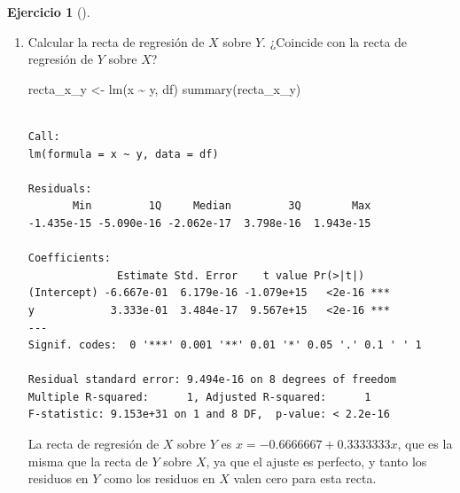 \documentclass[
  a4paper,
]{scrreport}
\newenvironment{Shaded}{\begin{snugshade}}{\end{snugshade}}
\newcommand{\FunctionTok}[1]{\textcolor[rgb]{0.28,0.35,0.67}{#1}}
\newcommand{\NormalTok}[1]{\textcolor[rgb]{0.00,0.23,0.31}{#1}}
\newcommand{\OtherTok}[1]{\textcolor[rgb]{0.00,0.23,0.31}{#1}}
\newcommand{\SpecialCharTok}[1]{\textcolor[rgb]{0.37,0.37,0.37}{#1}}
\theoremstyle{definition}
\newtheorem{exercise}{Ejercicio}[chapter]
\theoremstyle{remark}
\begin{document}
\begin{exercise}[]
\begin{enumerate}
\begin{tcolorbox}
  \end{tcolorbox}
\item
  Calcular la recta de regresión de \(X\) sobre \(Y\). ¿Coincide con la
  recta de regresión de \(Y\) sobre \(X\)?

  \begin{tcolorbox}[enhanced jigsaw, toprule=.15mm, rightrule=.15mm, arc=.35mm, colback=white, colbacktitle=quarto-callout-tip-color!10!white, toptitle=1mm, left=2mm, colframe=quarto-callout-tip-color-frame, opacityback=0, breakable, opacitybacktitle=0.6, bottomtitle=1mm, titlerule=0mm, title=\textcolor{quarto-callout-tip-color}{\faLightbulb}\hspace{0.5em}{Solución}, bottomrule=.15mm, coltitle=black, leftrule=.75mm]

\begin{Shaded}
\begin{Highlighting}[]
\NormalTok{recta\_x\_y }\OtherTok{\textless{}{-}} \FunctionTok{lm}\NormalTok{(x }\SpecialCharTok{\textasciitilde{}}\NormalTok{ y, df) }
\FunctionTok{summary}\NormalTok{(recta\_x\_y)}
\end{Highlighting}
\end{Shaded}

\begin{verbatim}

Call:
lm(formula = x ~ y, data = df)

Residuals:
       Min         1Q     Median         3Q        Max 
-1.435e-15 -5.090e-16 -2.062e-17  3.798e-16  1.943e-15 

Coefficients:
              Estimate Std. Error    t value Pr(>|t|)    
(Intercept) -6.667e-01  6.179e-16 -1.079e+15   <2e-16 ***
y            3.333e-01  3.484e-17  9.567e+15   <2e-16 ***
---
Signif. codes:  0 '***' 0.001 '**' 0.01 '*' 0.05 '.' 0.1 ' ' 1

Residual standard error: 9.494e-16 on 8 degrees of freedom
Multiple R-squared:      1, Adjusted R-squared:      1 
F-statistic: 9.153e+31 on 1 and 8 DF,  p-value: < 2.2e-16
\end{verbatim}

  La recta de regresión de \(X\) sobre \(Y\) es
  \(x = -0.6666667 + 0.3333333 x\), que es la misma que la recta de
  \(Y\) sobre \(X\), ya que el ajuste es perfecto, y tanto los residuos
  en \(Y\) como los residuos en \(X\) valen cero para esta recta.

  \end{tcolorbox}
\end{enumerate}

\end{exercise}
\end{document}
